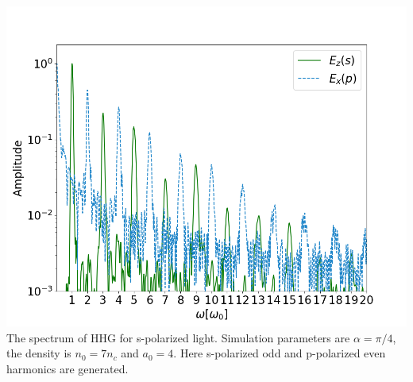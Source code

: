 \documentclass{beamer}
\begin{document}
\begin{frame}
\begin{minipage}[h]{0.48\linewidth}
        \includegraphics[width=1\textwidth, height=0.60\textheight]{images/s_fft.png}
        \scriptsize{The spectrum of HHG for s-polarized light. Simulation parameters are $\alpha = \pi/4$, the density is $n_0 = 7n_c$ and $a_0 = 4$. Here s-polarized odd and p-polarized even harmonics are generated.}
        \label{fig:s-fft}
    \end{minipage}

\end{frame}
\end{document}
